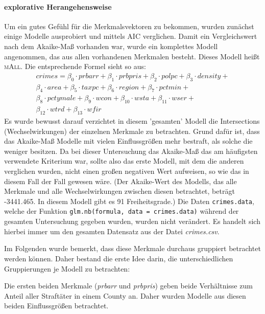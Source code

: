 \paragraph{explorative Herangehensweise}
\par\smallskip
Um ein gutes Gef\"uhl f\"ur die Merkmalsvektoren zu bekommen, wurden zun\"achst einige Modelle ausprobiert und mittels AIC verglichen.
Damit ein Vergleichswert nach dem Akaike-Ma\ss{} vorhanden war, wurde ein komplettes Modell angenommen, das aus allen vorhandenen Merkmalen besteht. Dieses Modell hei\ss{}t \textsc{mAll}. Die entsprechende Formel sieht so aus:
\begin{equation}\begin{split}
crimes = 
\beta_0 \cdot prbarr+ \beta_1 \cdot prbpris + \beta_2  \cdot polpc +  \beta_3 \cdot density + \\
\beta_4 \cdot area + \beta_5 \cdot taxpc + \beta_6 \cdot region + \beta_7 \cdot pctmin + \\
\beta_8 \cdot pctymale + \beta_9 \cdot wcon + \beta_{10} \cdot wsta + \beta_{11} \cdot wser + \\
\beta_{12} \cdot wtrd + \beta_{13} \cdot wfir
\end{split}
\end{equation}
Es wurde bewusst darauf verzichtet in diesem 'gesamten' Modell die Intersections (Wechselwirkungen) der einzelnen Merkmale zu betrachten. Grund daf\"ur ist, dass das Akaike-Ma\ss{} Modelle mit vielen Einflussgr\"o\ss{}en mehr bestraft, als solche die weniger besitzen. Da bei dieser Untersuchung das Akaike-Ma\ss{} das am h\"aufigsten verwendete Kriterium war, sollte also das erste Modell, mit dem die anderen verglichen wurden, nicht einen gro\ss{}en negativen Wert aufweisen, so wie das in diesem Fall der Fall gewesen w\"are. (Der Akaike-Wert des Modells, das alle Merkmale und alle Wechselwirkungen zwischen diesen betrachtet, betr\"agt -3441.465. In diesem Modell gibt es 91 Freiheitsgrade.)
Die Daten \texttt{crimes.data}, welche der Funktion \texttt{glm.nb(formula, data = crimes.data)} w\"ahrend der gesamten Untersuchung gegeben wurden, wurden nicht ver\"andert. Es handelt sich hierbei immer um den gesamten Datensatz aus der Datei \textit{crimes.csv}.
\par\bigskip
Im Folgenden wurde bemerkt, dass diese Merkmale durchaus gruppiert betrachtet werden k\"onnen. Daher bestand die erste Idee darin, die unterschiedlichen Gruppierungen je Modell zu betrachten:
\par\smallskip
Die ersten beiden Merkmale (\textit{prbarr} und \textit{prbpris}) geben beide Verh\"altnisse zum Anteil aller Straft\"ater in einem County an. Daher wurden Modelle aus diesen beiden Einflussgr\"o\ss{}en betrachtet. \\
